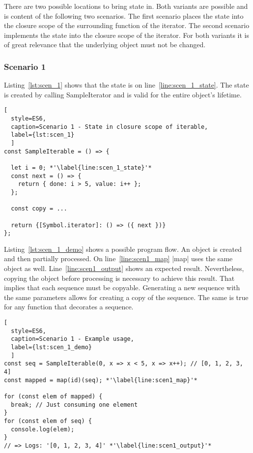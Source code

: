 There are two possible locations to bring state in. 
Both variants are possible and is content of the following two scenarios. 
The first scenario places the state into the closure scope of the surrounding 
function of the iterator. The second scenario implements the state into the 
closure scope of the iterator.
For both variants it is of great relevance that the underlying object must not 
be changed.

\subsubsection{Scenario 1}
Listing~\ref{lst:scen_1} shows that the state is on line~\ref{line:scen_1_state}.
The state is created by calling SampleIterator and is valid for the entire 
object's lifetime. 

\begin{lstlisting}[
  style=ES6, 
  caption=Scenario 1 - State in closure scope of iterable,
  label={lst:scen_1}
  ]
const SampleIterable = () => {

  let i = 0; *'\label{line:scen_1_state}'*
  const next = () => {
    return { done: i > 5, value: i++ };
  };

  const copy = ...

  return {[Symbol.iterator]: () => ({ next })}
};
\end{lstlisting}

Listing~\ref{lst:scen_1_demo} shows a possible program flow. An object is created 
and then partially processed. On line~\ref{line:scen1_map} |map| uses the same 
object as well. Line~\ref{line:scen1_output} shows an expected result. 
Nevertheless, copying the object before processing is necessary to achieve this 
result. That implies that each sequence must be copyable. Generating a new 
sequence with the same parameters allows for creating a copy of the sequence. 
The same is true for any function that decorates a sequence.

\begin{lstlisting}[
  style=ES6, 
  caption=Scenario 1 - Example usage,
  label={lst:scen_1_demo}
  ]
const seq = SampleIterable(0, x => x < 5, x => x++); // [0, 1, 2, 3, 4]
const mapped = map(id)(seq); *'\label{line:scen1_map}'*

for (const elem of mapped) {
  break; // Just consuming one element
}
for (const elem of seq) {
  console.log(elem);
}
// => Logs: '[0, 1, 2, 3, 4]' *'\label{line:scen1_output}'*
\end{lstlisting}

